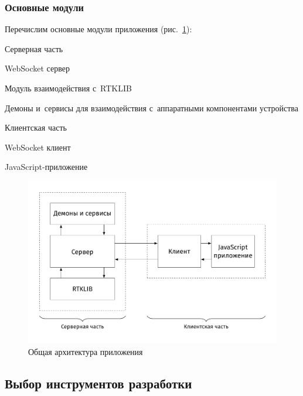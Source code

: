 \subsubsection{Основные модули}
\label{subsec:app-modules}

Перечислим основные модули приложения (рис.~\ref{fig:raw-system-architecture}):

\begin{alphitemize}
  \item Серверная часть
  \begin{alphitemize}
    \item WebSocket сервер
    \item Модуль взаимодействия с~RTKLIB
    \item Демоны и~сервисы для взаимодействия с~аппаратными компонентами устройства
  \end{alphitemize}

  \item Клиентская часть
  \begin{alphitemize}
    \item WebSocket клиент
    \item JavaScript-приложение
  \end{alphitemize}
\end{alphitemize}

\begin{figure}[h!]
  \centering
  \setlength{\fboxsep}{5pt}
  \includegraphics[width=.9\textwidth]{img/tikz/raw-system-architecture/pic}
  \vspace*{12pt}
  \caption{Общая архитектура приложения}\label{fig:raw-system-architecture}
\end{figure}

\subsection{Выбор инструментов разработки}
\label{subsec:programming-tools}

